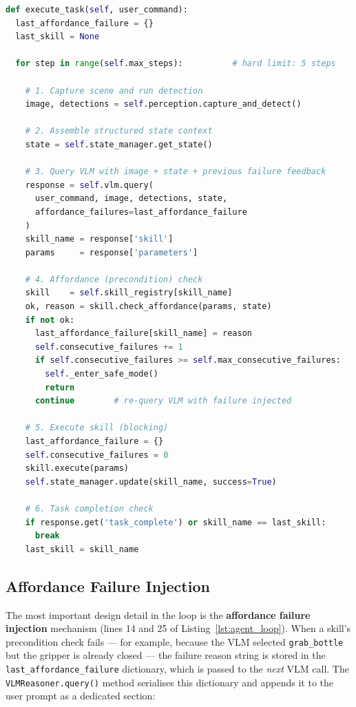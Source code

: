 \begin{lstlisting}[language=Python, caption={Simplified perceive-reason-act loop in \texttt{EmbodiedAgent.execute\_task()}.}, label={lst:agent_loop}]
def execute_task(self, user_command):
  last_affordance_failure = {}
  last_skill = None

  for step in range(self.max_steps):          # hard limit: 5 steps

    # 1. Capture scene and run detection
    image, detections = self.perception.capture_and_detect()

    # 2. Assemble structured state context
    state = self.state_manager.get_state()

    # 3. Query VLM with image + state + previous failure feedback
    response = self.vlm.query(
      user_command, image, detections, state,
      affordance_failures=last_affordance_failure
    )
    skill_name = response['skill']
    params     = response['parameters']

    # 4. Affordance (precondition) check
    skill    = self.skill_registry[skill_name]
    ok, reason = skill.check_affordance(params, state)
    if not ok:
      last_affordance_failure[skill_name] = reason
      self.consecutive_failures += 1
      if self.consecutive_failures >= self.max_consecutive_failures:
        self._enter_safe_mode()
        return
      continue        # re-query VLM with failure injected

    # 5. Execute skill (blocking)
    last_affordance_failure = {}
    self.consecutive_failures = 0
    skill.execute(params)
    self.state_manager.update(skill_name, success=True)

    # 6. Task completion check
    if response.get('task_complete') or skill_name == last_skill:
      break
    last_skill = skill_name
\end{lstlisting}

\subsection{Affordance Failure Injection}

The most important design detail in the loop is the
\textbf{affordance failure injection} mechanism (lines 14 and 25 of
Listing~\ref{lst:agent_loop}).
When a skill's precondition check fails --- for example, because the VLM
selected \texttt{grab\_bottle} but the gripper is already closed ---
the failure reason string is stored in the \texttt{last\_affordance\_failure}
dictionary, which is passed to the \emph{next} VLM call.
The \texttt{VLMReasoner.query()} method serialises this dictionary and appends
it to the user prompt as a dedicated section:

